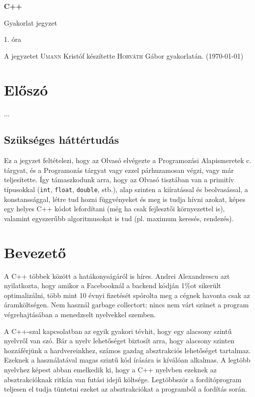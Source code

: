 \documentclass[a4paper,11.5pt,table]{article}
\begin{document}
	\setlength\parindent{0pt}
	\def\<{<\hspace{0mm}<}
	
	\theoremstyle{definition}
	\newtheorem{note}{Megjegyzés}[subsection]
	
	\begin{center}
		{\LARGE\textbf{C++}}
		
		{\Large Gyakorlat jegyzet}
		
		1. óra
	\end{center}
	A jegyzetet \textsc{Umann} Kristóf készítette \textsc{Horváth} Gábor gyakorlatán. (\today)
	\section{Előszó}
	...
	\subsection{Szükséges háttértudás}
	Ez a jegyzet feltételezi, hogy az Olvasó elvégezte a Programozási Alapismeretek c. tárgyat, és a Programozás tárgyat vagy ezzel párhuzamosan végzi, vagy már teljesítette. Így támaszkodunk arra, hogy az Olvasó tisztában van a primitív típusokkal (\texttt{int}, \texttt{float}, \texttt{double}, stb.), alap szinten a kiíratással és beolvasással, a konstanssággal, létre tud hozni függvényeket és meg is tudja hívni azokat, képes egy helyes C++ kódot lefordítani (még ha csak fejlesztői környezettel is), valamint egyszerűbb algoritmusokat is tud (pl. maximum keresés, rendezés).
	\section{Bevezető}
	A C++ többek között a hatákonyságáról is híres. Andrei Alexandrescu azt nyilatkozta, hogy amikor a Facebooknál a backend kódján 1\%ot sikerült optimalizálni, több mint 10 évnyi fizetését spórolta meg a cégnek havonta csak az áramköltségen. Nem használ garbage collectort: nincs nem várt szünet a program végrehajtásában a menedzselt nyelvekkel szemben.

	A C++-szal kapcsolatban az egyik gyakori tévhit, hogy egy alacsony szintű nyelvről van szó. Bár a nyelv lehetőséget biztosít arra, hogy alacsony szinten hozzáférjünk a hardvereinkhez, számos gazdag absztrakciós lehetőséget tartalmaz. Ezeknek a használatával magas szintű kód írására is kíválóan alkalmas. A legtöbb nyelvhez képest abban emelkedik ki, hogy a C++ nyelvben ezeknek az absztrakcióknak ritkán van futási idejű költsége. Legtöbbször a fordítóprogram teljesen el tudja tüntetni ezeket az absztrakciókat a programból a fordítás során.
	
\end{document}
